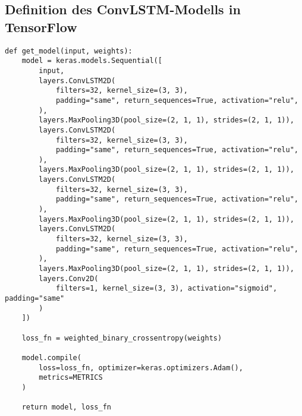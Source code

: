 \subsection{Definition des ConvLSTM-Modells in TensorFlow}
\label{sec:ModellDefTF}

\begin{code}
\begin{verbatim}
def get_model(input, weights):
    model = keras.models.Sequential([
        input,
        layers.ConvLSTM2D(
            filters=32, kernel_size=(3, 3),
            padding="same", return_sequences=True, activation="relu",
        ),
        layers.MaxPooling3D(pool_size=(2, 1, 1), strides=(2, 1, 1)),
        layers.ConvLSTM2D(
            filters=32, kernel_size=(3, 3),
            padding="same", return_sequences=True, activation="relu",
        ),
        layers.MaxPooling3D(pool_size=(2, 1, 1), strides=(2, 1, 1)),
        layers.ConvLSTM2D(
            filters=32, kernel_size=(3, 3),
            padding="same", return_sequences=True, activation="relu",
        ),
        layers.MaxPooling3D(pool_size=(2, 1, 1), strides=(2, 1, 1)),
        layers.ConvLSTM2D(
            filters=32, kernel_size=(3, 3),
            padding="same", return_sequences=True, activation="relu",
        ),
        layers.MaxPooling3D(pool_size=(2, 1, 1), strides=(2, 1, 1)),
        layers.Conv2D(
            filters=1, kernel_size=(3, 3), activation="sigmoid", padding="same"
        )
    ])

    loss_fn = weighted_binary_crossentropy(weights)

    model.compile(
        loss=loss_fn, optimizer=keras.optimizers.Adam(),
        metrics=METRICS
    )

    return model, loss_fn
\end{verbatim}
\label{lst:ModellDefTF}
\end{code}
